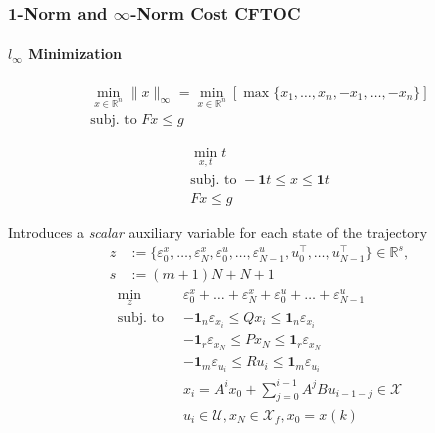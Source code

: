 \subsubsection[1-Norm and Inf-Norm Cost]{1-Norm and $\infty$-Norm Cost CFTOC}
\paragraph[linf Minimization]{$l_{\infty}$ Minimization}
\noindent
\begin{gather*}
    \min_{x \in \mathbb{R}^n} \|x\|_\infty = \min_{x \in \mathbb{R}^n} \left[\max \{x_1, \dots, x_n, -x_1, \dots, -x_n\}\right] \\
    \text{subj.\ to } Fx \leq g
\end{gather*}

\newpar{}
\begin{gather*}
    \min_{x, t} t \\
    \text{subj.\ to } -\mathbf{1} t \leq x \leq \mathbf{1} t\\
    Fx \leq g
\end{gather*}


Introduces a \textit{scalar} auxiliary variable for each state of the trajectory
\begin{align*}
    z & := \{ \varepsilon_{0}^x, \dots, \varepsilon_{N}^x, \varepsilon_{0}^u, \dots, \varepsilon_{N-1}^u, u_0^\top, \dots, u_{N-1}^\top \} \in \mathbb{R}^s, \\
    s & := (m + 1) N + N + 1
\end{align*}
\noindent
\begin{align*}
    \min_z\quad          & \varepsilon_{0}^x + \dots + \varepsilon_{N}^x + \varepsilon_{0}^u + \dots + \varepsilon_{N-1}^u \\
    \text{subj.\ to } \  & -\mathbf{1}_n \varepsilon_{x_i} \leq  Q x_i \leq \mathbf{1}_n \varepsilon_{x_i}                 \\
                         & -\mathbf{1}_r \varepsilon_{x_N} \leq  P x_N \leq \mathbf{1}_r \varepsilon_{x_N}                 \\
                         & -\mathbf{1}_m \varepsilon_{u_i} \leq  R u_i \leq \mathbf{1}_m \varepsilon_{u_i}                 \\
                         & x_i = A^i x_0 + \sum_{j=0}^{i-1} A^j B u_{i-1-j}\in \mathcal{X}                                 \\
                         & u_i \in \mathcal{U}, x_N \in \mathcal{X}_f, x_0 = x(k)
\end{align*}

